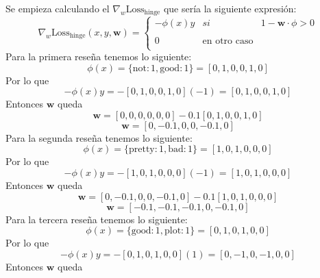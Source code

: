 \documentclass[14pt,a4paper]{report}
\begin{document}
Se empieza calculando el $\nabla_{w}\text{Loss}_{\text{hinge}}$ que sería la siguiente expresión:
\begin{equation*}
	\nabla_{w}\text{Loss}_{\text{hinge}}(x,y,\mathbf{w})=\left\{ \begin{array}{lcc}
             -\phi(x)y &   si  & 1-\mathbf{w}\cdot\phi > 0 \\
             \\ 0 &  \text{en otro caso} \\
             \end{array}
   \right.
\end{equation*}
Para la primera reseña tenemos lo siguiente:\\
\begin{equation*}
	\phi(x)=\{\text{not}:1,\text{good}:1\}=[0,1,0,0,1,0]
\end{equation*}
Por lo que
\begin{equation*}
	-\phi(x)y=-[0,1,0,0,1,0](-1)=[0,1,0,0,1,0]
\end{equation*}
Entonces $\mathbf{w}$ queda
\begin{equation*}
	\mathbf{w}=[0,0,0,0,0,0]-0.1[0,1,0,0,1,0]
\end{equation*}
\begin{equation*}
	\mathbf{w}=[0,-0.1,0,0,-0.1,0]
\end{equation*}
Para la segunda reseña tenemos lo siguiente:\\
\begin{equation*}
	\phi(x)=\{\text{pretty}:1,\text{bad}:1\}=[1,0,1,0,0,0]
\end{equation*}
Por lo que
\begin{equation*}
	-\phi(x)y=-[1,0,1,0,0,0](-1)=[1,0,1,0,0,0]
\end{equation*}
Entonces $\mathbf{w}$ queda
\begin{equation*}
	\mathbf{w}=[0,-0.1,0,0,-0.1,0]-0.1[1,0,1,0,0,0]
\end{equation*}
\begin{equation*}
	\mathbf{w}=[-0.1,-0.1,-0.1,0,-0.1,0]
\end{equation*}
Para la tercera reseña tenemos lo siguiente:\\
\begin{equation*}
	\phi(x)=\{\text{good}:1,\text{plot}:1\}=[0,1,0,1,0,0]
\end{equation*}
Por lo que
\begin{equation*}
	-\phi(x)y=-[0,1,0,1,0,0](1)=[0,-1,0,-1,0,0]
\end{equation*}
Entonces $\mathbf{w}$ queda
\end{document}
